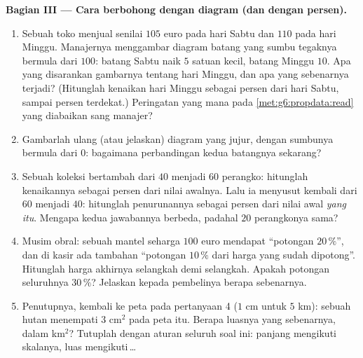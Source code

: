 \begin{problem}
\medskip
\noindent\textbf{Bagian III --- Cara berbohong dengan diagram (dan
dengan persen).}
\begin{enumerate}[resume]
  \item Sebuah toko menjual senilai $105$ euro pada hari Sabtu dan
        $110$ pada hari Minggu. Manajernya menggambar diagram batang
        yang sumbu tegaknya bermula dari $100$: batang Sabtu naik $5$
        satuan kecil, batang Minggu $10$. Apa yang disarankan
        gambarnya tentang hari Minggu, dan apa yang sebenarnya
        terjadi? (Hitunglah kenaikan hari Minggu sebagai persen dari
        hari Sabtu, sampai persen terdekat.) Peringatan yang mana
        pada \cref{met:g6:propdata:read} yang diabaikan sang manajer?
  \item Gambarlah ulang (atau jelaskan) diagram yang jujur, dengan
        sumbunya bermula dari $0$: bagaimana perbandingan kedua
        batangnya sekarang?
  \item Sebuah koleksi bertambah dari $40$ menjadi $60$ perangko:
        hitunglah kenaikannya sebagai persen dari nilai awalnya. Lalu
        ia menyusut kembali dari $60$ menjadi $40$: hitunglah
        penurunannya sebagai persen dari nilai awal \emph{yang itu}.
        Mengapa kedua jawabannya berbeda, padahal $20$ perangkonya sama?
  \item Musim obral: sebuah mantel seharga $100$ euro mendapat
        ``potongan $20\,\%$'', dan di kasir ada tambahan ``potongan
        $10\,\%$ dari harga yang sudah dipotong''. Hitunglah harga
        akhirnya selangkah demi selangkah. Apakah potongan
        seluruhnya $30\,\%$? Jelaskan kepada pembelinya berapa
        sebenarnya.
  \item Penutupnya, kembali ke peta pada pertanyaan 4 ($1$ cm untuk
        $5$ km): sebuah hutan menempati $3$ cm$^2$ pada peta itu.
        Berapa luasnya yang sebenarnya, dalam km$^2$? Tutuplah dengan
        aturan seluruh soal ini: panjang mengikuti skalanya, luas
        mengikuti\,\dots

\end{enumerate}
\end{problem}

